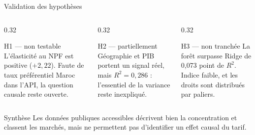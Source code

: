\documentclass[aspectratio=169,10pt]{beamer}
\begin{document}
\begin{frame}{Validation des hypothèses}
  \begin{columns}[T,onlytextwidth]
    \begin{column}{0.32\textwidth}
      \begin{block}{H1 --- non testable}
        L'élasticité au NPF est positive ($+2{,}22$). Faute de taux
        préférentiel Maroc dans l'API, la question causale reste ouverte.
      \end{block}
    \end{column}
    \begin{column}{0.32\textwidth}
      \begin{block}{H2 --- partiellement}
        Géographie et PIB portent un signal réel, mais $R^2 = 0{,}286$ :
        l'essentiel de la variance reste inexpliqué.
      \end{block}
    \end{column}
    \begin{column}{0.32\textwidth}
      \begin{block}{H3 --- non tranchée}
        La forêt surpasse Ridge de 0,073 point de $R^2$. Indice faible,
        et les droits sont distribués par paliers.
      \end{block}
    \end{column}
  \end{columns}
  \vspace{0.8em}
  \begin{block}{Synthèse}
    Les données publiques accessibles décrivent bien la concentration et
    classent les marchés, mais ne permettent pas d'identifier un effet
    causal du tarif.
  \end{block}
\end{frame}
\end{document}
